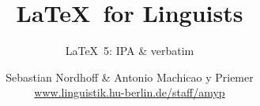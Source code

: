 


\title{
	\LaTeX\ for Linguists
}

\subtitle{\LaTeX\ 5: IPA \& verbatim}

\author[aMyP]{
	{\small Sebastian Nordhoff \& Antonio Machicao y Priemer}
	\\
	{\footnotesize \url{www.linguistik.hu-berlin.de/staff/amyp}}
}








\begin{frame}
  \HUtitle
\end{frame}





\nocite{Freitag&MyP15a}
\nocite{Knuth1986}
\nocite{Kopka94a}
\nocite{MyP17c}
\nocite{MyP&Kerkhof16a}
	


%
%
%
%
%


